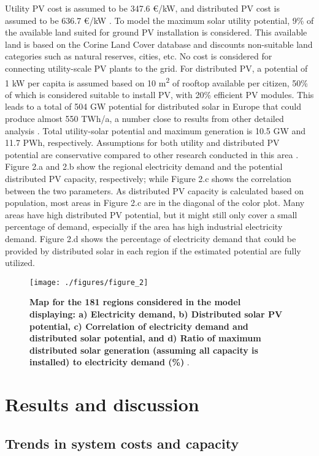 \documentclass[review]{elsarticle}
\begin{document}
Utility PV cost is assumed to be 347.6 €/kW, and distributed PV cost is assumed to be 636.7 €/kW \cite{dea_2020}. To model the maximum solar utility potential, 9\% of the available land suited for ground PV installation is considered. This available land is based on the Corine Land Cover database and discounts non-suitable land categories such as natural reserves, cities, etc. No cost is considered for connecting utility-scale PV plants to the grid. For distributed PV, a potential of 1 kW per capita is assumed based on 10 m\textsuperscript{2} of rooftop available per citizen, 50\% of which is considered suitable to install PV, with 20\% efficient PV modules. This leads to a total of 504 GW potential for distributed solar in Europe that could produce almost 550 TWh/a, a number close to results from other detailed analysis \cite{huld_2018,bodis_2019}. Total utility-solar potential and maximum generation is 10.5 GW and 11.7 PWh, respectively. Assumptions for both utility and distributed PV potential are conservative compared to other research conducted in this area \cite{trondle_2019}. Figure 2.a and 2.b show the regional electricity demand and the potential distributed PV capacity, respectively; while Figure 2.c shows the correlation between the two parameters. As distributed PV capacity is calculated based on population, most areas in Figure 2.c are in the diagonal of the color plot. Many areas have high distributed PV potential, but it might still only cover a small percentage of demand, especially if the area has high industrial electricity demand. Figure 2.d shows the percentage of electricity demand that could be provided by distributed solar in each region if the estimated potential are fully utilized. 

\begin{figure}[!htb]
    \texttt{[image: ./figures/figure\_2]}
    \caption{\textbf{Map for the 181 regions considered in the model displaying: a) Electricity demand, b) Distributed solar PV potential, c) Correlation of electricity demand and distributed solar potential, and d) Ratio of maximum distributed solar generation (assuming all capacity is installed) to electricity demand (\%)} .}
   \label{fig:demand/capacity}
\end{figure}


\section{Results and discussion}

\subsection{Trends in system costs and capacity}
\end{document}
